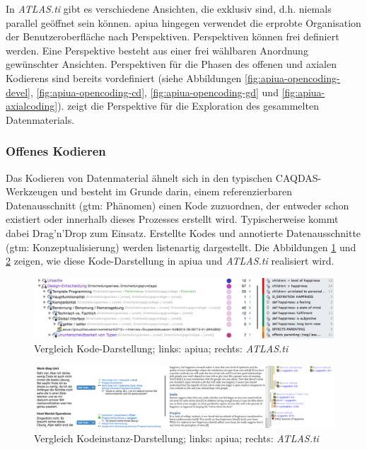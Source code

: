 In \textit{ATLAS.ti} gibt es verschiedene Ansichten, die exklusiv sind, d.h. niemals parallel geöffnet sein können. \gls{apiua} hingegen verwendet die erprobte Organisation der Benutzeroberfläche nach Perspektiven. Perspektiven können frei definiert werden. Eine Perspektive besteht aus einer frei wählbaren Anordnung gewünschter Ansichten. Perspektiven für die Phasen des offenen und axialen Kodierens sind bereits vordefiniert (siehe Abbildungen \ref{fig:apiua-opencoding-devel}, \ref{fig:apiua-opencoding-cd}, \ref{fig:apiua-opencoding-gd} und \ref{fig:apiua-axialcoding}).  zeigt die Perspektive für die Exploration des gesammelten Datenmaterials.





\subsubsection{Offenes Kodieren}
\label{sec:apiua-open-coding}

Das Kodieren von Datenmaterial ähnelt sich in den typischen CAQDAS-Werkzeugen und besteht im Grunde darin, einem referenzierbaren Datenausschnitt (\gls{gtm}: Phänomen) einen Kode zuzuordnen, der entweder schon existiert oder innerhalb dieses Prozesses erstellt wird. Typischerweise kommt dabei Drag'n'Drop zum Einsatz. Erstellte Kodes und annotierte Datenausschnitte (\gls{gtm}: Konzeptualisierung) werden listenartig dargestellt. Die Abbildungen \ref{fig:apiua-codes-atlas} und \ref{fig:apiua-codeinstances-atlas} zeigen, wie diese Kode-Darstellung in \gls{apiua} und \textit{ATLAS.ti} realisiert wird.

\begin{figure}
  \centering
    \includegraphics[width=1.0\linewidth]{Figures/apiua/codes-atlas.png}
  \caption[Vergleich APIUA und ATLAS.ti: Kode-Darstellung]{Vergleich Kode-Darstellung; links: \gls{apiua}; rechts: \textit{ATLAS.ti}}
  \label{fig:apiua-codes-atlas}
\end{figure}

\begin{figure}
  \centering
    \includegraphics[width=1.0\linewidth]{Figures/apiua/codeinstances-atlas.png}
  \caption[Vergleich APIUA und ATLAS.ti: Kodeinstanz-Darstellung]{Vergleich Kodeinstanz-Darstellung; links: \gls{apiua}; rechts: \textit{ATLAS.ti}}
  \label{fig:apiua-codeinstances-atlas}
\end{figure}

